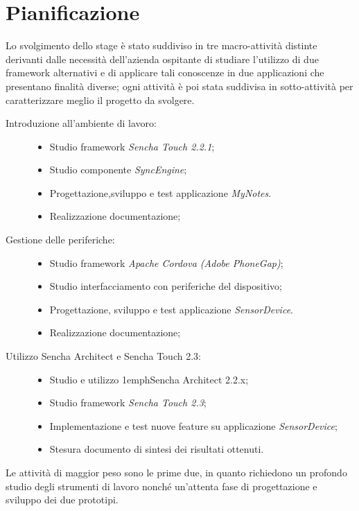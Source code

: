 \chapter{Pianificazione}\label{ch:pianificazione}
Lo svolgimento dello stage è stato suddiviso in tre macro-attività distinte derivanti dalle necessità dell'azienda ospitante di studiare l'utilizzo di due framework alternativi e di applicare tali conoscenze in due applicazioni che presentano finalità diverse; ogni attività è poi stata suddivisa in sotto-attività per caratterizzare meglio il progetto da svolgere.
\begin{description}
\item[Introduzione all'ambiente di lavoro:] \hfill
	\begin{itemize}
	\item Studio framework \emph{Sencha Touch 2.2.1};
	\item Studio componente \emph{SyncEngine};
	\item Progettazione,sviluppo e test applicazione \emph{MyNotes}.
	\item Realizzazione documentazione;
	\end{itemize}
\item[Gestione delle periferiche:] \hfill
	\begin{itemize}
	\item Studio framework \emph{Apache Cordova (Adobe PhoneGap)};
	\item Studio interfacciamento con periferiche del dispositivo;
	\item Progettazione, sviluppo e test applicazione \emph{SensorDevice}.
	\item Realizzazione documentazione;
	\end{itemize}
\item[Utilizzo Sencha Architect e Sencha Touch 2.3:] \hfill
	\begin{itemize}
	\item Studio e utilizzo 1emph{Sencha Architect 2.2.x};
	\item Studio framework \emph{Sencha Touch 2.3};
	\item Implementazione e test nuove feature su applicazione \emph{SensorDevice};
	\item Stesura documento di sintesi dei risultati ottenuti.
	\end{itemize}
\end{description}
Le attività di maggior peso sono le prime due, in quanto richiedono un profondo studio degli strumenti di lavoro nonché un'attenta fase di progettazione e sviluppo dei due prototipi.

